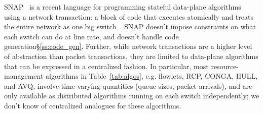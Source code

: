 SNAP~\cite{snap} is a recent language for programming stateful data-plane
algorithms using a network transaction: a block of code that executes
atomically and treats the entire network as one big switch~\cite{onebigswitch}.
SNAP doesn't impose constraints on what each switch can do at line rate, and
doesn't handle code generation\S\ref{ss:code_gen}. Further, while network
transactions are a higher level of abstraction than packet transactions, they
are limited to data-plane algorithms that can be expressed in a centralized
fashion. In particular, most resource-management algorithms in
Table~\ref{tab:algos}, e.g. flowlets, RCP, CONGA, HULL, and AVQ, involve
time-varying quantities (queue sizes, packet arrivals), and are only available
as distributed algorithms running on each switch independently; we don't know
of centralized analogues for these algorithms.

%
%
